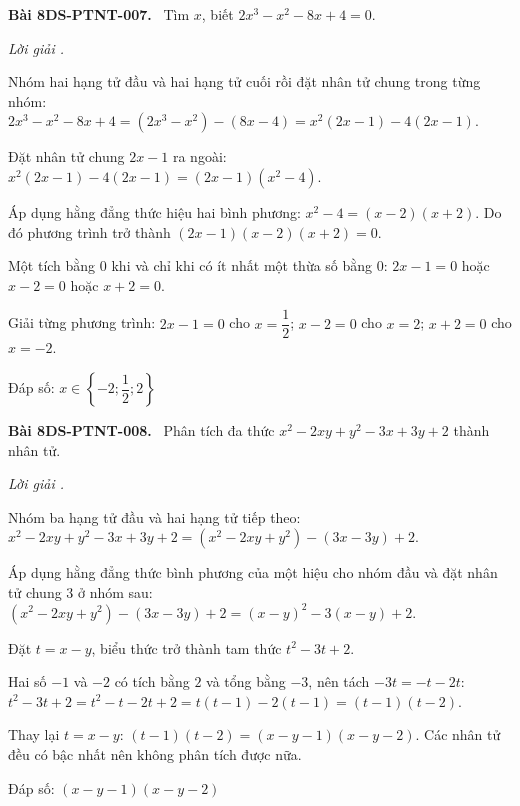 \documentclass[12pt,a4paper]{article}
\newenvironment{problem}[1][]{\par\medskip\noindent\textbf{Bài #1.}\ }{\par}
\newenvironment{solution}[1][]{\par\noindent\textit{Lời giải #1.}\par}{\par}
\begin{document}
\begin{problem}[8DS-PTNT-007]
Tìm $x$, biết $2x^3 - x^2 - 8x + 4 = 0$.

\begin{solution}
Nhóm hai hạng tử đầu và hai hạng tử cuối rồi đặt nhân tử chung trong từng nhóm: $2x^3 - x^2 - 8x + 4 = (2x^3 - x^2) - (8x - 4) = x^2(2x - 1) - 4(2x - 1)$.

Đặt nhân tử chung $2x - 1$ ra ngoài: $x^2(2x - 1) - 4(2x - 1) = (2x - 1)(x^2 - 4)$.

Áp dụng hằng đẳng thức hiệu hai bình phương: $x^2 - 4 = (x - 2)(x + 2)$. Do đó phương trình trở thành $(2x - 1)(x - 2)(x + 2) = 0$.

Một tích bằng $0$ khi và chỉ khi có ít nhất một thừa số bằng $0$: $2x - 1 = 0$ hoặc $x - 2 = 0$ hoặc $x + 2 = 0$.

Giải từng phương trình: $2x - 1 = 0$ cho $x = \dfrac{1}{2}$; $x - 2 = 0$ cho $x = 2$; $x + 2 = 0$ cho $x = -2$.

Đáp số: $\boxed{x \in \left\{-2; \dfrac{1}{2}; 2\right\}}$
\end{solution}
\end{problem}

\begin{problem}[8DS-PTNT-008]
Phân tích đa thức $x^2 - 2xy + y^2 - 3x + 3y + 2$ thành nhân tử.

\begin{solution}
Nhóm ba hạng tử đầu và hai hạng tử tiếp theo: $x^2 - 2xy + y^2 - 3x + 3y + 2 = (x^2 - 2xy + y^2) - (3x - 3y) + 2$.

Áp dụng hằng đẳng thức bình phương của một hiệu cho nhóm đầu và đặt nhân tử chung $3$ ở nhóm sau: $(x^2 - 2xy + y^2) - (3x - 3y) + 2 = (x - y)^2 - 3(x - y) + 2$.

Đặt $t = x - y$, biểu thức trở thành tam thức $t^2 - 3t + 2$.

Hai số $-1$ và $-2$ có tích bằng $2$ và tổng bằng $-3$, nên tách $-3t = -t - 2t$: $t^2 - 3t + 2 = t^2 - t - 2t + 2 = t(t - 1) - 2(t - 1) = (t - 1)(t - 2)$.

Thay lại $t = x - y$: $(t - 1)(t - 2) = (x - y - 1)(x - y - 2)$. Các nhân tử đều có bậc nhất nên không phân tích được nữa.

Đáp số: $\boxed{(x - y - 1)(x - y - 2)}$
\end{solution}
\end{problem}
\end{document}

